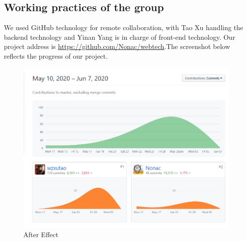 \documentclass[11pt]{article}
\begin{document}
\begin{spacing}{1.0}
	\section{Working practices of the group}
	We used GitHub technology for remote collaboration, with Tao Xu handling the backend technology and Yinan Yang is in charge of front-end technology. Our project address is \href{https://github.com/Nonac/webtech}{https://github.com/Nonac/webtech}.The screenshot below reflects the progress of our project.
	
	\begin{figure}[H]
		\centering
		\includegraphics[scale=0.7]{figures/github.png}
		\caption{After Effect}
		\label{fig:15}
	\end{figure}
	
	
\end{spacing}	
	
\end{document}
